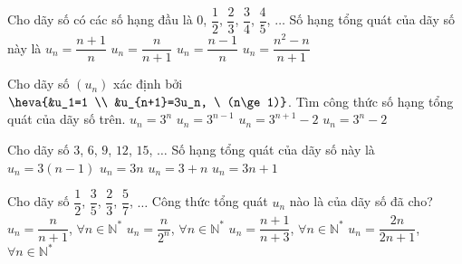 \begin{ex}%
	Cho dãy số có các số hạng đầu là $0$, $\dfrac{1}{2}$, $\dfrac{2}{3}$, $\dfrac{3}{4}$, $\dfrac{4}{5}$, $\ldots$ Số hạng tổng quát  của dãy số này là
	\choice 
		{$u_n=\dfrac{n+1}{n}$} 
		 {\True $u_n=\dfrac{n}{n+1}$}
		 {$u_n=\dfrac{n-1}{n}$}
		 {$u_n=\dfrac{n^2-n}{n+1}$}
\end{ex}

\begin{ex}%
	Cho dãy số  $(u_n)$ xác định bởi $\heva{&u_1=1 \\
	&u_{n+1}=3u_n, \ (n\ge 1)} $. Tìm công  thức số hạng tổng quát của dãy số trên.
	\choice 
		{$u_n=3^n$} 
		{\True  $u_n=3^{n-1}$}
		 {$u_n=3^{n+1}-2$}
		 {$u_n=3^n-2$}
\end{ex}

\begin{ex}%
	Cho  dãy số $3$, $6$, $9$, $12$, $15$, $\ldots$ Số hạng tổng quát của dãy số này là
	\choice 
		 {$u_n = 3(n - 1)$}
		{\True $u_n =  3n$}
		{$u_n  = 3 + n$}
		{$u_n = 3n +  1$}
\end{ex}

\begin{ex}%
	Cho dãy số  $\dfrac{1}{2}$, $\dfrac{3}{5}$, $\dfrac{2}{3}$, $\dfrac{5}{7}$, $\ldots$ Công thức tổng quát $u_n$ nào là của dãy số đã cho?
	\choice 
		{$u_n=\dfrac{n}{n+1}$, $\forall n \in \mathbb{N}^*$} 
		{$u_n=\dfrac{n}{2^n}$,  $\forall n \in \mathbb{N}^*$}
		{\True $u_n=\dfrac{n+1}{n+3}$, $\forall n  \in \mathbb{N}^*$}
		{$u_n=\dfrac{2n}{2n+1}$,  $\forall n \in \mathbb{N}^*$}
\end{ex}

